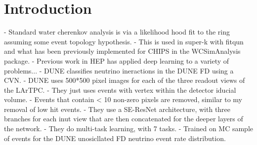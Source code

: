 \section{Introduction}
\label{sec:cvn_intro}
- Standard water cherenkov analysis is via a likelihood hood fit to the ring assuming some event topology hypothesis.
- This is used in super-k with fitqun and what has been previously implemented for CHIPS in the WCSimAnalysis package.
- Previous work in HEP has applied deep learning to a variety of problems...
- DUNE classifies neutrino ineractions in the DUNE FD using a CVN.
- DUNE uses 500*500 pixel images for each of the three readout views of the LArTPC.
- They just uses events with vertex within the detector iducial volume.
- Events that contain < 10 non-zero pixels are removed, similar to my removal of low hit events.
- They use a SE-ResNet architecture, with three branches for each inut view that are then concatenated for the deeper layers of the network.
- They do multi-task learning, with 7 tasks.
- Trained on MC sample of events for the DUNE unosicllated FD neutrino event rate distribution.


